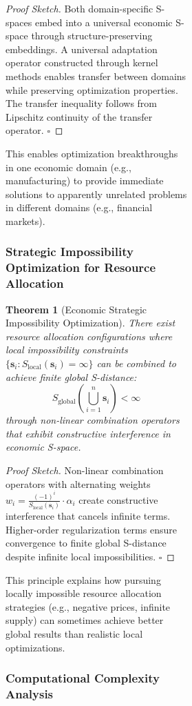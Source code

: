 \documentclass[12pt,a4paper]{article}
\newtheorem{theorem}{Theorem}
\begin{document}
\begin{figure}[H]
\begin{figure}[H]
\begin{figure}[H]
\begin{proof}[Proof Sketch]
Both domain-specific S-spaces embed into a universal economic S-space through structure-preserving embeddings. A universal adaptation operator constructed through kernel methods enables transfer between domains while preserving optimization properties. The transfer inequality follows from Lipschitz continuity of the transfer operator. $\square$
\end{proof}

This enables optimization breakthroughs in one economic domain (e.g., manufacturing) to provide immediate solutions to apparently unrelated problems in different domains (e.g., financial markets).

\subsubsection{Strategic Impossibility Optimization for Resource Allocation}

\begin{theorem}[Economic Strategic Impossibility Optimization]
There exist resource allocation configurations where local impossibility constraints $\{\mathbf{s}_i : S_{\text{local}}(\mathbf{s}_i) = \infty\}$ can be combined to achieve finite global S-distance:
\begin{equation}
S_{\text{global}}\left(\bigcup_{i=1}^n \mathbf{s}_i\right) < \infty
\end{equation}
through non-linear combination operators that exhibit constructive interference in economic S-space.
\end{theorem}

\begin{proof}[Proof Sketch]
Non-linear combination operators with alternating weights $w_i = \frac{(-1)^i}{S_{\text{local}}(\mathbf{s}_i)} \cdot \alpha_i$ create constructive interference that cancels infinite terms. Higher-order regularization terms ensure convergence to finite global S-distance despite infinite local impossibilities. $\square$
\end{proof}

This principle explains how pursuing locally impossible resource allocation strategies (e.g., negative prices, infinite supply) can sometimes achieve better global results than realistic local optimizations.

\subsubsection{Computational Complexity Analysis}


\end{figure}
\end{figure}
\end{figure}
\end{document}
